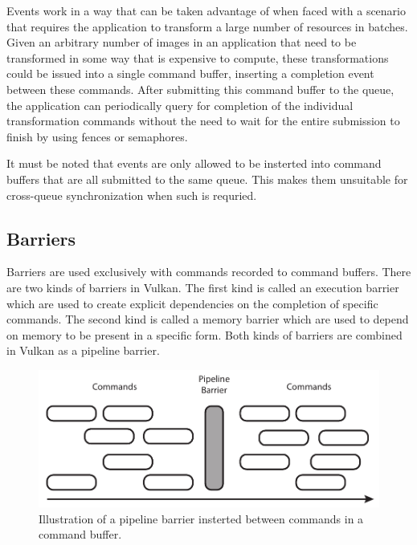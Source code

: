       Events work in a way that can be taken advantage of when faced with a scenario that requires the \gls{application} to transform a large number of resources in batches. Given an arbitrary number of images in an \gls{application} that need to be transformed in some way that is expensive to compute, these transformations could be issued into a single command buffer, inserting a completion event between these commands. After submitting this command buffer to the queue, the \gls{application} can periodically query for completion of the individual transformation commands without the need to wait for the entire submission to finish by using fences or semaphores.

      It must be noted that events are only allowed to be insterted into command buffers that are all submitted to the same queue. This makes them unsuitable for cross-queue synchronization when such is requried.

    \subsection{Barriers}
    \label{sub:Barriers}
      Barriers are used exclusively with commands recorded to command buffers. There are two kinds of barriers in Vulkan. The first kind is called an execution barrier which are used to create explicit dependencies on the completion of specific commands. The second kind is called a memory barrier which are used to depend on memory to be present in a specific form. Both kinds of barriers are combined in Vulkan as a pipeline barrier.

      \begin{figure}
        \centering
        \includegraphics{Main/Images/PipelineBarrier}
        \caption{Illustration of a pipeline barrier insterted between commands in a command buffer.}
        \label{fig:PipelineBarrier}
      \end{figure}

